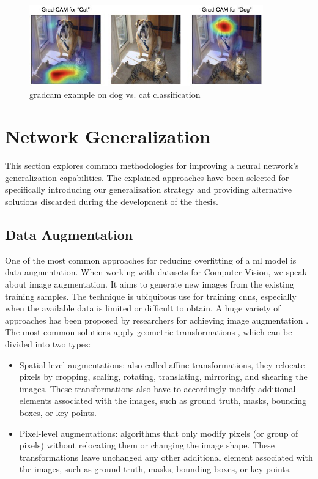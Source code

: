 \begin{figure}[!htb]
    \centering
    \includegraphics[width=0.9\textwidth]{"contents/images/gradcam/02-gradcam-catdog"}
    \caption[\gls{gradcam} example on dog vs. cat classification]{\gls{gradcam} example on dog vs. cat classification \cite{Selvaraju_2019}}
    \label{fig:gradcam-catdog}
\end{figure}




\section{Network Generalization}
\label{sec:network-generalization}

This section explores common methodologies for improving a neural network's generalization capabilities. The explained approaches have been selected for specifically introducing our generalization strategy and providing alternative solutions discarded during the development of the thesis.



\subsection{Data Augmentation}
\label{subsec:data-augmentation}

One of the most common approaches for reducing overfitting of a \gls{ml} model is data augmentation. When working with datasets for Computer Vision, we speak about image augmentation. It aims to generate new images from the existing training samples. The technique is ubiquitous use for training \gls{cnn}s, especially when the available data is limited or difficult to obtain. A huge variety of approaches has been proposed by researchers for achieving image augmentation \cite{shorten2019augmentationsurvey}. The most common solutions apply geometric transformations \cite{xie2020unsupervised}, which can be divided into two types:
\begin{itemize}
	\item Spatial-level augmentations: also called affine transformations, they relocate pixels by cropping, scaling, rotating, translating, mirroring, and shearing the images. These transformations also have to accordingly modify additional elements associated with the images, such as ground truth, masks, bounding boxes, or key points.
	\item Pixel-level augmentations: algorithms that only modify pixels (or group of pixels) without relocating them or changing the image shape. These transformations leave unchanged any other additional element associated with the images, such as ground truth, masks, bounding boxes, or key points.
\end{itemize}

